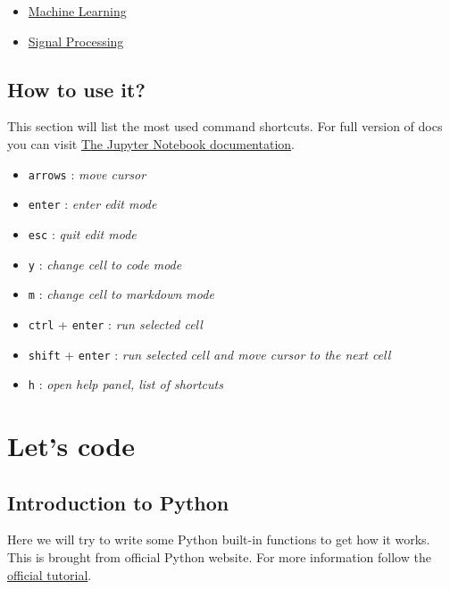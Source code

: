 \documentclass[11pt]{article}
\providecommand{\tightlist}{%
      \setlength{\itemsep}{0pt}\setlength{\parskip}{0pt}}
\begin{document}
\begin{itemize}
\tightlist
\item
  \href{https://nbviewer.jupyter.org/github/rhiever/Data-Analysis-and-Machine-Learning-Projects/blob/master/example-data-science-notebook/Example\%2520Machine\%2520Learning\%2520Notebook.ipynb}{Machine
  Learning}
\item
  \href{https://www.gw-openscience.org/s/events/GW150914/GW150914_tutorial.html}{Signal
  Processing}
\end{itemize}

\subsection{How to use it?}\label{how-to-use-it}

This section will list the most used command shortcuts. For full version
of docs you can visit
\href{http://jupyter-notebook.readthedocs.io/en/latest/notebook.html}{The
Jupyter Notebook documentation}.

\begin{itemize}
\tightlist
\item
  \texttt{arrows} : \emph{move cursor}
\item
  \texttt{enter} : \emph{enter edit mode}
\item
  \texttt{esc} : \emph{quit edit mode}
\item
  \texttt{y} : \emph{change cell to code mode}
\item
  \texttt{m} : \emph{change cell to markdown mode}
\item
  \texttt{ctrl} + \texttt{enter} : \emph{run selected cell}
\item
  \texttt{shift} + \texttt{enter} : \emph{run selected cell and move
  cursor to the next cell}
\item
  \texttt{h} : \emph{open help panel, list of shortcuts}
\end{itemize}

    \section{Let's code}\label{lets-code}

\subsection{Introduction to Python}\label{introduction-to-python}

Here we will try to write some Python built-in functions to get how it
works. This is brought from official Python website. For more
information follow the
\href{https://docs.python.org/3/tutorial/}{official tutorial}.
\end{document}
